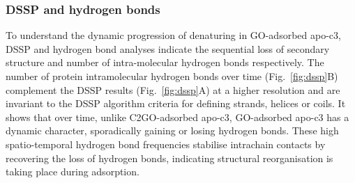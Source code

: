 \subsubsection{DSSP and hydrogen bonds}
%
To understand the dynamic progression of denaturing in GO-adsorbed apo-c3, DSSP and hydrogen bond analyses indicate the sequential loss of secondary structure and number of intra-molecular hydrogen bonds respectively. The number of protein intramolecular hydrogen bonds over time (Fig.~\ref{fig:dssp}B) complement the DSSP results (Fig.~\ref{fig:dssp}A) at a higher resolution and are invariant to the DSSP algorithm criteria for defining strands, helices or coils. It shows that over time, unlike C2GO-adsorbed apo-c3, GO-adsorbed apo-c3 has a dynamic character, sporadically gaining or losing hydrogen bonds. These high spatio-temporal hydrogen bond frequencies stabilise intrachain contacts by recovering the loss of hydrogen bonds, indicating structural reorganisation is taking place during adsorption. \\


